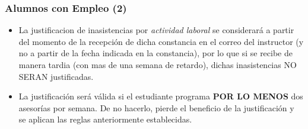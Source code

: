 \begin{frame}
\frametitle{Alumnos con Empleo (2)}
\begin{itemize}
\item La justificacion de inasistencias por \textit{actividad laboral} se considerar\'a a partir del momento de la recepci\'on de dicha constancia en el correo del instructor (y no a partir de la fecha indicada en la constancia), por lo que si se recibe de manera tardia (con mas de una semana de retardo), dichas inasistencias NO SERAN justificadas.
\item La justificación será válida si el estudiante programa \textbf{POR LO MENOS} dos asesorías por semana. De no hacerlo, pierde el beneficio de la justificación y se aplican las reglas anteriormente establecidas. 
\end{itemize}

\end{frame}






